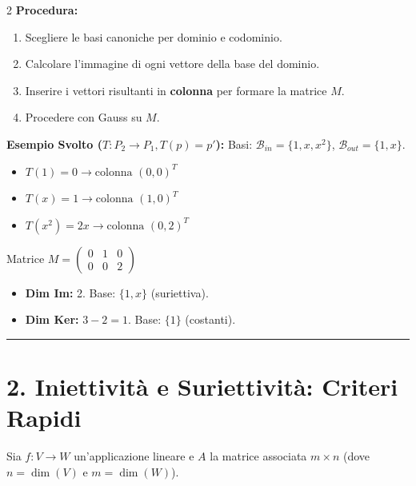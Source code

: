 \documentclass[10pt,a4paper]{article}
\begin{document}
\begin{multicols}{2}
\medskip
\textbf{Procedura:}
\begin{enumerate}
    \item Scegliere le basi canoniche per dominio e codominio.
    \item Calcolare l'immagine di ogni vettore della base del dominio.
    \item Inserire i vettori risultanti in \textbf{colonna} per formare la matrice $M$.
    \item Procedere con Gauss su $M$.
\end{enumerate}

\textbf{Esempio Svolto ($T: P_2 \to P_1, T(p)=p'$):}
Basi: $\mathcal{B}_{in} = \{1, x, x^2\}$, $\mathcal{B}_{out} = \{1, x\}$.

\begin{itemize}
    \item $T(1) = 0 \to \text{colonna } (0, 0)^T$
    \item $T(x) = 1 \to \text{colonna } (1, 0)^T$
    \item $T(x^2) = 2x \to \text{colonna } (0, 2)^T$
\end{itemize}

Matrice $M = \begin{pmatrix} 0 & 1 & 0 \\ 0 & 0 & 2 \end{pmatrix}$
\begin{itemize}
    \item \textbf{Dim Im:} 2. Base: $\{1, x\}$ (suriettiva).
    \item \textbf{Dim Ker:} $3 - 2 = 1$. Base: $\{1\}$ (costanti).
\end{itemize}

\end{multicols}


\vspace{0.3cm}
\hrule
\vspace{0.5cm}

\section*{2. Iniettività e Suriettività: Criteri Rapidi}
Sia $f: V \to W$ un'applicazione lineare e $A$ la matrice associata $m \times n$ (dove $n = \dim(V)$ e $m = \dim(W)$).
\end{document}
